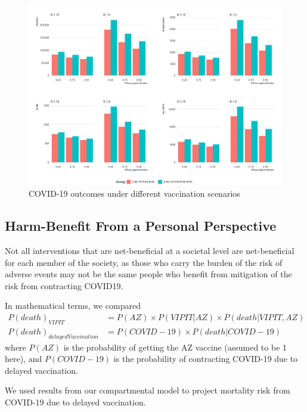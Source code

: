\documentclass[]{interact}
\theoremstyle{plain}%
\theoremstyle{definition}
\theoremstyle{remark}
\begin{document}
\begin{figure}

{\centering \includegraphics[width=1\linewidth]{../figures/fig-barplots} 

}

\caption{COVID-19 outcomes under different vaccination scenarios}\label{fig:fig2}
\end{figure}

\hypertarget{harm-benefit-from-a-personal-perspective}{%
\subsection{Harm-Benefit From a Personal
Perspective}\label{harm-benefit-from-a-personal-perspective}}

Not all interventions that are net-beneficial at a societal level are
net-beneficial for each member of the society, as those who carry the
burden of the risk of adverse events may not be the same people who
benefit from mitigation of the risk from contracting COVID19.

In mathematical terms, we compared \[
\begin{aligned}
P(death)_{VIPIT}  &= P(AZ) \times P(VIPIT|AZ) \times P(death|VIPIT, AZ) \\
P(death)_{delayedVaccination} &= P(COVID-19) \times P(death|COVID-19)
\end{aligned}
\] where \(P(AZ)\) is the probability of getting the AZ vaccine (assumed
to be 1 here), and \(P(COVID-19)\) is the probability of contracting
COVID-19 due to delayed vaccination.

We used results from our compartmental model to project mortality risk
from COVID-19 due to delayed vaccination.
\end{document}

